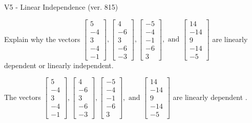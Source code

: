 \begin{exercise}
  \begin{exerciseTitle}V5 - Linear Independence (ver. 815)\end{exerciseTitle}
  \begin{exerciseStatement}
    Explain why the vectors \(\left[\begin{array}{r}
5 \\
-4 \\
3 \\
-4 \\
-1
\end{array}\right] , \left[\begin{array}{r}
4 \\
-6 \\
3 \\
-6 \\
-3
\end{array}\right] , \left[\begin{array}{r}
-5 \\
-4 \\
-1 \\
-6 \\
3
\end{array}\right] , \text{ and } \left[\begin{array}{r}
14 \\
-14 \\
9 \\
-14 \\
-5
\end{array}\right]\) are linearly dependent or linearly independent.	


  \end{exerciseStatement}
  \begin{exerciseAnswer}
   The vectors \(\left[\begin{array}{r}
5 \\
-4 \\
3 \\
-4 \\
-1
\end{array}\right] , \left[\begin{array}{r}
4 \\
-6 \\
3 \\
-6 \\
-3
\end{array}\right] , \left[\begin{array}{r}
-5 \\
-4 \\
-1 \\
-6 \\
3
\end{array}\right] , \text{ and } \left[\begin{array}{r}
14 \\
-14 \\
9 \\
-14 \\
-5
\end{array}\right]\) are 
  	 linearly dependent  .
  


  \end{exerciseAnswer}
\end{exercise}
